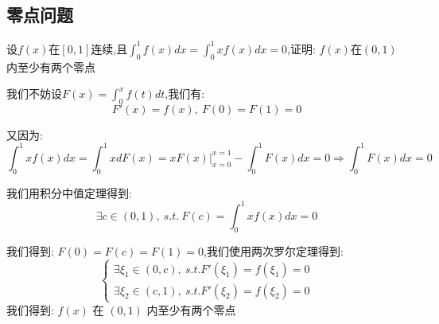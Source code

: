 \subsection{零点问题}

\begin{proposition}
	设$f(x)$在$[0,1]$连续,且$\int_{0}^{1}f(x)dx=\int_{0}^{1}xf(x)dx=0$,证明: $f(x)$在$(0,1)$内至少有两个零点
\end{proposition}
\begin{solution}

	我们不妨设$F(x)=\int_{0}^{x}f(t)dt$,我们有:
	$$F'(x)=f(x),\ F(0)=F(1)=0$$

	又因为: $$\int_{0}^{1}xf(x)dx=\int_{0}^{1}xdF(x)=xF(x)|_{x=0}^{x=1}-\int_{0}^{1}F(x)dx=0\Rightarrow \int_{0}^{1}F(x)dx=0$$

	我们用积分中值定理得到:
	$$\exists c\in(0,1),\ s.t.\ F(c)=\int_{0}^{1}xf(x)dx=0$$

	我们得到: $F(0)=F(c)=F(1)=0$,我们使用两次罗尔定理得到:
	$$\left\lbrace
		\begin{array}{l}
			\exists \xi_{1}\in(0,c),\ s.t. F'(\xi_{1})=f(\xi_{1})=0 \\
			\exists \xi_{2}\in(c,1),\ s.t. F'(\xi_{2})=f(\xi_{2})=0
		\end{array}
		\right.$$
	我们得到: $f(x)$ 在 $(0,1)$ 内至少有两个零点
\end{solution}


